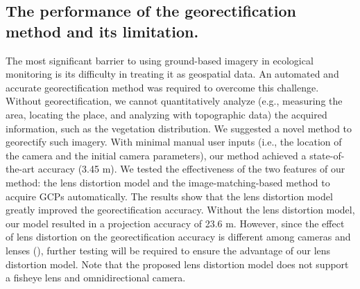 \documentclass{article}
\begin{document}
\hypertarget{the-performance-of-the-georectification-method-and-its-limitation.}{%
\subsection{The performance of the georectification method and its limitation.}\label{the-performance-of-the-georectification-method-and-its-limitation.}}

The most significant barrier to using ground-based imagery in ecological monitoring is its difficulty in treating it as geospatial data. An automated and accurate georectification method was required to overcome this challenge. Without georectification, we cannot quantitatively analyze (e.g., measuring the area, locating the place, and analyzing with topographic data) the acquired information, such as the vegetation distribution. We suggested a novel method to georectify such imagery. With minimal manual user inputs (i.e., the location of the camera and the initial camera parameters), our method achieved a state-of-the-art accuracy (3.45 m). We tested the effectiveness of the two features of our method: the lens distortion model and the image-matching-based method to acquire GCPs automatically.
The results show that the lens distortion model greatly improved the georectification accuracy. Without the lens distortion model, our model resulted in a projection accuracy of 23.6 m. However, since the effect of lens distortion on the georectification accuracy is different among cameras and lenses (\cite{Portenier2020Cryosphere}), further testing will be required to ensure the advantage of our lens distortion model. Note that the proposed lens distortion model does not support a fisheye lens and omnidirectional camera.
\end{document}
